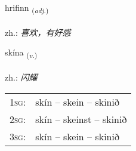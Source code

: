 \documentclass[frontgrid, backgrid]{flacards}\usepackage[]{graphicx}\usepackage[]{xcolor}
\begin{document}
\renewcommand{\flhead}{\vskip5pt \fboxsep=0pt {\small\bfseries\footnotesize Lýsingarorð | 形容词}}
\renewcommand{\fcfoot}{\vskip5pt \fboxsep=0pt \hspace{2pt}{\small\bfseries\footnotesize 3K}}

\renewcommand{\blhead}{\vskip5pt {\small\bfseries\footnotesize Lýsingarorð | 形容词 }}
\renewcommand{\bcfoot}{\vskip5pt \hspace{2pt}{\small\bfseries\footnotesize 3K}}


{hrifinn \small{\textsubscript{(\textit{adj.})}} \\[1ex] %
\textphonetic{[r̥ɪːvɪn]} \\
zh.: \emph{喜欢，有好感} \\  [2ex]
\renewcommand*{\arraystretch}{0.8}
}

\renewcommand{\flhead}{\vskip5pt \fboxsep=0pt {\small\bfseries\footnotesize Sagnorð | 动词}}
\renewcommand{\fcfoot}{\vskip5pt \fboxsep=0pt \hspace{2pt}{\small\bfseries\footnotesize 3K}}

\renewcommand{\blhead}{\vskip5pt {\small\bfseries\footnotesize Sagnorð | 动词 }}
\renewcommand{\bcfoot}{\vskip5pt \hspace{2pt}{\small\bfseries\footnotesize 3K}}


{skína \small{\textsubscript{(\textit{v.})}} \\[1ex] %
\textphonetic{[sciːna]} \\
zh.: \emph{闪耀} \\  [2ex]
\renewcommand*{\arraystretch}{0.8}
\begin{tabular}{p{1cm}l}
\textsc{1sg}: & skín -- skein -- skinið \\ 
\textsc{2sg}: & skín -- skeinst -- skinið \\ 
\textsc{3sg}: & skín -- skein -- skinið \\ 
\end{tabular}
}
\end{document}
